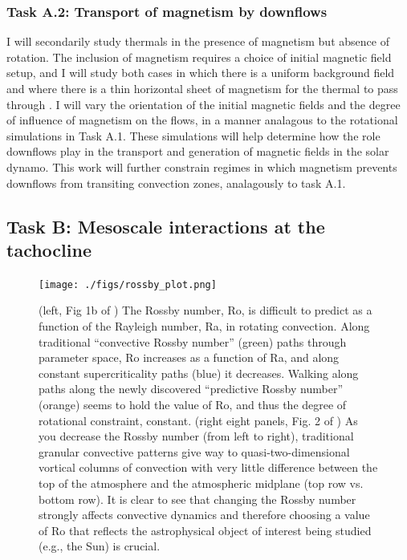 \documentclass[aasms,11pt, longbibliography]{article}
\begin{document}
\subsubsection{Task A.2: Transport of magnetism by downflows}
\label{sct:taskA2}
I will secondarily study thermals in the presence of magnetism but absence of rotation.
The inclusion of magnetism requires a choice of initial magnetic field setup, and I will study both cases in which there is a uniform background field and where there is a thin horizontal sheet of magnetism for the thermal to pass through \citep[as in][]{tobias&all1998}.
I will vary the orientation of the initial magnetic fields and the degree of influence of magnetism on the flows, in a manner analagous to the rotational simulations in Task A.1.
These simulations will help determine how the role downflows play in the transport and generation of magnetic fields in the solar dynamo.
This work will further constrain regimes in which magnetism prevents downflows from transiting convection zones, analagously to task A.1. 

\subsection{Task B: Mesoscale interactions at the tachocline}
\label{sct:taskB}
\begin{figure}[t!]
    \texttt{[image: ./figs/rossby\_plot.png]}
    \caption{(left, Fig 1b of \citet{anders&all2019}) The Rossby number, Ro, is difficult to predict as a function of the Rayleigh number, Ra, in rotating convection.
	Along traditional ``convective Rossby number'' (green) paths through parameter space, Ro increases as a function of Ra, and along constant supercriticality paths (blue) it decreases.
	Walking along paths along the newly discovered ``predictive Rossby number'' (orange) seems to hold the value of Ro, and thus the degree of rotational constraint, constant.
	(right eight panels, Fig. 2 of \citet{anders&all2019}) As you decrease the Rossby number (from left to right), traditional granular convective patterns give way to quasi-two-dimensional vortical columns of convection with very little difference between the top of the atmosphere and the atmospheric midplane (top row vs. bottom row).
	It is clear to see that changing the Rossby number strongly affects convective dynamics and therefore choosing a value of Ro that reflects the astrophysical object of interest being studied (e.g., the Sun) is crucial.
	\label{fig:rossby_plot} }
\end{figure}
\end{document}
